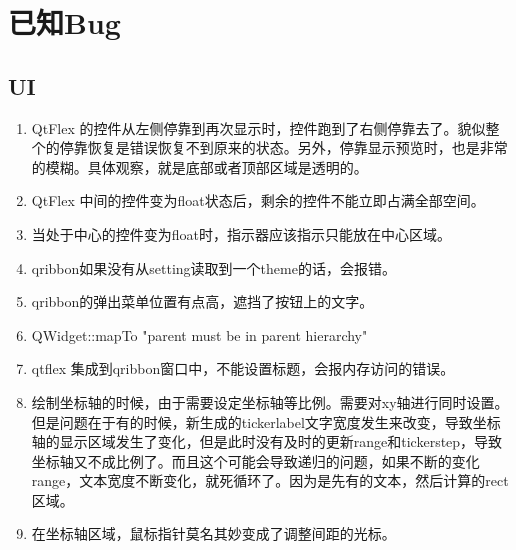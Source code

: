 \section{已知Bug}

\subsection{UI}

\begin{enumerate}
	\item QtFlex 的控件从左侧停靠到再次显示时，控件跑到了右侧停靠去了。貌似整个的停靠恢复是错误恢复不到原来的状态。另外，停靠显示预览时，也是非常的模糊。具体观察，就是底部或者顶部区域是透明的。
	\item QtFlex 中间的控件变为float状态后，剩余的控件不能立即占满全部空间。
	\item 当处于中心的控件变为float时，指示器应该指示只能放在中心区域。
	
	\item qribbon如果没有从setting读取到一个theme的话，会报错。
	
	\item qribbon的弹出菜单位置有点高，遮挡了按钮上的文字。
	
	\item QWidget::mapTo "parent must be in parent hierarchy"
	
	\item qtflex 集成到qribbon窗口中，不能设置标题，会报内存访问的错误。
	
	\item 绘制坐标轴的时候，由于需要设定坐标轴等比例。需要对xy轴进行同时设置。但是问题在于有的时候，新生成的tickerlabel文字宽度发生来改变，导致坐标轴的显示区域发生了变化，但是此时没有及时的更新range和tickerstep，导致坐标轴又不成比例了。而且这个可能会导致递归的问题，如果不断的变化range，文本宽度不断变化，就死循环了。因为是先有的文本，然后计算的rect区域。
	
	\item 在坐标轴区域，鼠标指针莫名其妙变成了调整间距的光标。
\end{enumerate}